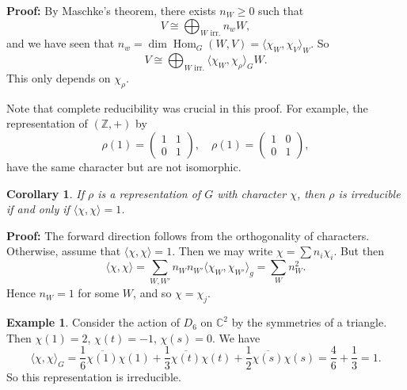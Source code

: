 \documentclass[12pt]{article}
\DeclareMathOperator{\Hom}{Hom}
\newtheorem{corollary}{Corollary}[section]
\theoremstyle{definition}
\newtheorem{example}{Example}[section]
\theoremstyle{remark}
\begin{document}
\begin{adjustbox}{minipage = \columnwidth - 25.5pt, margin=1em, frame=1pt, margin=0em}
\textbf{Proof:} By Maschke's theorem, there exists $n_W \geq 0$ such that
\[
	V \cong \bigoplus_{W \text{ irr.}} n_w W
,\]
and we have seen that $n_w = \dim \Hom_G(W, V) = \langle \chi_W, \chi_V \rangle_W$. So
\[
	V \cong \bigoplus_{W \text{ irr.}} \langle \chi_W, \chi_\rho \rangle_G W
.\]
This only depends on $\chi_{\rho}$.
\end{adjustbox}

Note that complete reducibility was crucial in this proof. For example, the representation of $(\mathbb{Z}, +)$ by
\[
	\rho(1) =
	\begin{pmatrix}
		1 & 1 \\
		0 & 1
	\end{pmatrix}
	, \quad \rho(1) =
	\begin{pmatrix}
		1 & 0 \\
		0 & 1
	\end{pmatrix}
,\]
have the same character but are not isomorphic.

\begin{corollary}
	If $\rho$ is a representation of $G$ with character $\chi$, then $\rho$ is irreducible if and only if $\langle \chi, \chi \rangle = 1$.
\end{corollary}

\begin{adjustbox}{minipage = \columnwidth - 25.5pt, margin=1em, frame=1pt, margin=0em}
	\textbf{Proof:} The forward direction follows from the orthogonality of characters. Otherwise, assume that $\langle \chi, \chi \rangle = 1$. Then we may write $\chi = \sum n_i \chi_i$. But then
	\[
		\langle \chi, \chi \rangle = \sum_{W, W'} n_W n_{W'} \langle \chi_W, \chi_{W'} \rangle_g = \sum_{W}n_W^2
	.\]
	Hence $n_W = 1$ for some $W$, and so $\chi = \chi_j$.
\end{adjustbox}

\begin{adjustbox}{minipage = \columnwidth - 25.5pt, margin=1em, frame=1pt, margin=0em}
\begin{example}
	Consider the action of $D_6$ on $\mathbb{C}^2$ by the symmetries of a triangle. Then $\chi(1) = 2$, $\chi(t) = -1$, $\chi(s) = 0$. We have
	\[
		\langle \chi, \chi \rangle_G = \frac{1}{6} \overline{\chi(1)}\chi(1) + \frac{1}{3} \overline{\chi(t)} \chi(t) + \frac{1}{2} \overline{\chi(s)}\chi(s) = \frac{4}{6} + \frac{1}{3} = 1
	.\]
	So this representation is irreducible.
\end{example}

\end{adjustbox}
\end{document}
